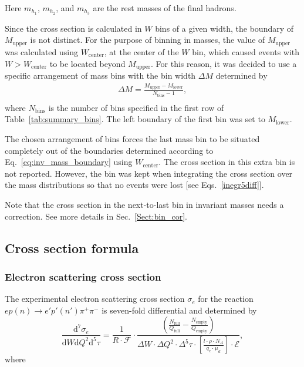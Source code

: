 \documentclass[prc,twocolumn,superscriptaddress,showpacs,amssymb,amsmath,amsfonts,aps,nofootinbib]{revtex4-1}
\begin{document}
Here $m_{h_1}$, $m_{h_2}$, and $m_{h_3}$ are the rest masses of the final hadrons. 


Since the cross section is calculated in $W$ bins of a given width, the boundary of $M_{\text{upper}}$ is not distinct. For the purpose of binning in masses, the value of $M_{\text{upper}}$ was calculated using $W_{\text{center}}$, at the center of the $W$ bin, which caused events with $W > W_{\text{center}}$ to be located beyond $M_{\text{upper}}$. For this reason, it was decided to use a specific arrangement of mass bins with the bin width $\Delta M$ determined by
\begin{equation}
\begin{aligned}
\Delta M = \frac{M_{\text{upper}}-M_{\text{lower}}}{N_{\text{bins}}-1}, \\[-10pt]\label{eq:bin_width}
\end{aligned}  
\end{equation} 
where $N_{\text{bins}}$ is the number of bins specified in the first row of Table~\ref{tab:summary_bins}. The left boundary of the first bin was set to $M_{\text{lower}}$.

The chosen arrangement of bins forces the last mass bin to be situated completely out of the boundaries determined according to Eq.\!~\eqref{eq:inv_mass_boundary} using $W_{\text{center}}$. The cross section in this extra bin is not reported. However, the bin was kept when integrating the cross section over the mass distributions so that no events were lost [see  Eqs.\!~\eqref{inegr5diff}].


Note that the cross section in the next-to-last bin in invariant masses needs a correction. See more details in Sec.\!~\ref{Sect:bin_cor}.

\subsection{Cross section formula}
\label{Sect:cr_sect_formula}

\subsubsection{Electron scattering cross section}

The experimental electron scattering cross section $\sigma_{e}$ for the reaction $ep(n) \rightarrow e'p'(n') \pi^{+} \pi^{-}$ is seven-fold differential and determined by
\begin{equation}
\frac{\textrm{d}^{7}\sigma_{e}}{\textrm{d}W\textrm{d}Q^{2}\textrm{d}^{5}\tau} = \frac{1}{ R \! \cdot \! \mathcal{F}}  \cdot 
\frac{\left( \frac{N_{\text{full}}}{Q_{\text{full}}}-\frac{N_{\text{empty}}}{Q_{\text{empty}}} \right)}{
\Delta W \! \cdot \! \Delta Q^{2} \! \cdot \! \Delta^{5} \tau \! \cdot \! \left[ \frac{l \cdot \rho \cdot N_{A}}{q_{e}\cdot \mu_{d}} \right]\! \cdot \!\mathcal{E}},
\label{expcrossect}
\end{equation}
where
\end{document}
